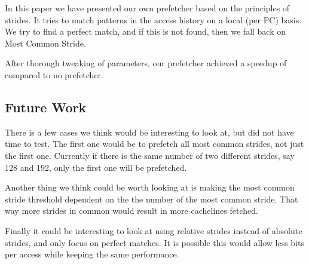 In this paper we have presented our own prefetcher based on the principles of strides. It tries to match patterns in the access history on a local (per PC) basis. We try to find a perfect match, and if this is not found, then we fall back on Most Common Stride.

After thorough tweaking of parameters, our prefetcher achieved a speedup of \speedup compared to no prefetcher. 

\subsection{Future Work}
There is a few cases we think would be interesting to look at, but did not have
time to test. The first one would be to prefetch all most common strides, not
just the first one. Currently if there is the same number of two different
strides, say 128 and 192, only the first one will be prefetched.

Another thing we think could be worth looking at is making the most common
stride threshold dependent on the the number of the most common stride.
That way more strides in common would result in more cachelines fetched.

Finally it could be interesting to look at using relative strides instead of
absolute strides, and only focus on perfect matches. It is possible this would
allow less bits per access while keeping the same performance.
\balance
